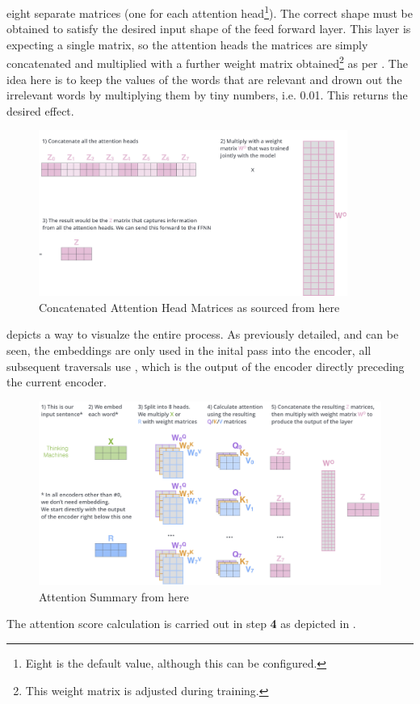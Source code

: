 eight separate matrices (one for each attention head\footnote{Eight is the default value, although this can be configured.}). The correct shape
must be obtained to satisfy the desired input shape of the feed forward layer. This layer is expecting a single matrix, so the attention heads
the matrices are simply concatenated and multiplied with a further weight matrix obtained\footnote{This weight matrix is adjusted during training.} as per
. The idea here is to keep the values of the words that are relevant and drown out the irrelevant words by multiplying
them by tiny numbers, i.e. 0.01. This returns the desired effect.
\begin{figure}[H]
	\centering
	\includegraphics[width=0.9\textwidth]{figures/concat_atn_head_matrices.png}
	\caption{Concatenated Attention Head Matrices as sourced from here~\autocite{alammarIllustratedTransformer}}
	\label{fig:concat_atn_head_matrices}
\end{figure}
 depicts a way to visualze the entire process. As previously detailed, and can be seen, the embeddings are only
used in the inital pass into the encoder, all subsequent traversals use , which is the output of the encoder directly preceding the
current encoder.
\begin{figure}[H]
	\centering
	\includegraphics[width=1\textwidth]{figures/atn_summary.png}
	\caption{Attention Summary from here~\autocite{alammarIllustratedTransformer}}
	\label{fig:atn_summary}
\end{figure}
The attention score calculation is carried out in step \textbf{4} as depicted in . \\
